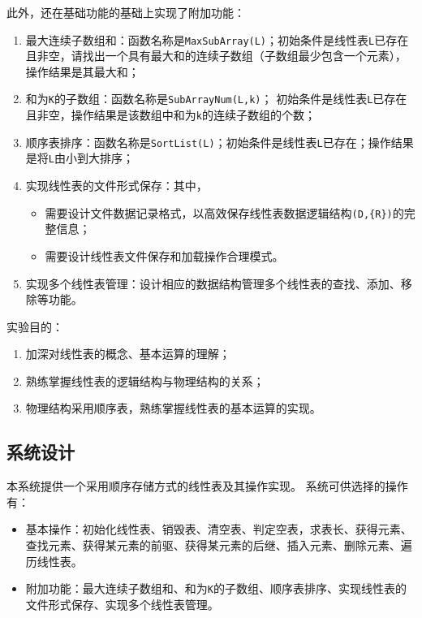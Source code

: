 \documentclass[supercite]{Experimental_Report}
\theoremstyle{definition}
\begin{document}
此外，还在基础功能的基础上实现了附加功能：
\begin{enumerate}

	\item 最大连续子数组和：函数名称是\verb|MaxSubArray(L)|；初始条件是线性表\verb|L|已存在且非空，请找出一个具有最大和的连续子数组（子数组最少包含一个元素），操作结果是其最大和；


	\item 和为\verb|K|的子数组：函数名称是\verb|SubArrayNum(L,k)|； 初始条件是线性表\verb|L|已存在且非空，操作结果是该数组中和为\verb|k|的连续子数组的个数；


	\item 顺序表排序：函数名称是\verb|SortList(L)|；初始条件是线性表\verb|L|已存在；操作结果是将\verb|L|由小到大排序；

	\item 实现线性表的文件形式保存：其中，
	\begin{itemize}
		\item 需要设计文件数据记录格式，以高效保存线性表数据逻辑结构\verb|(D,{R})|的完整信息；
		\item  需要设计线性表文件保存和加载操作合理模式。
	\end{itemize}

	\item 实现多个线性表管理：设计相应的数据结构管理多个线性表的查找、添加、移除等功能。
\end{enumerate}
实验目的：
\begin{enumerate}
	\item 加深对线性表的概念、基本运算的理解；
	\item 熟练掌握线性表的逻辑结构与物理结构的关系；
	\item 物理结构采用顺序表，熟练掌握线性表的基本运算的实现。
\end{enumerate}

\subsection{系统设计}
本系统提供一个采用顺序存储方式的线性表及其操作实现。
系统可供选择的操作有：
\begin{itemize}
	\item 基本操作：初始化线性表、销毁表、清空表、判定空表，求表长、获得元素、查找元素、获得某元素的前驱、获得某元素的后继、插入元素、删除元素、遍历线性表。
	\item 附加功能：最大连续子数组和、和为\verb|K|的子数组、顺序表排序、实现线性表的文件形式保存、实现多个线性表管理。
\end{itemize}
\end{document}
